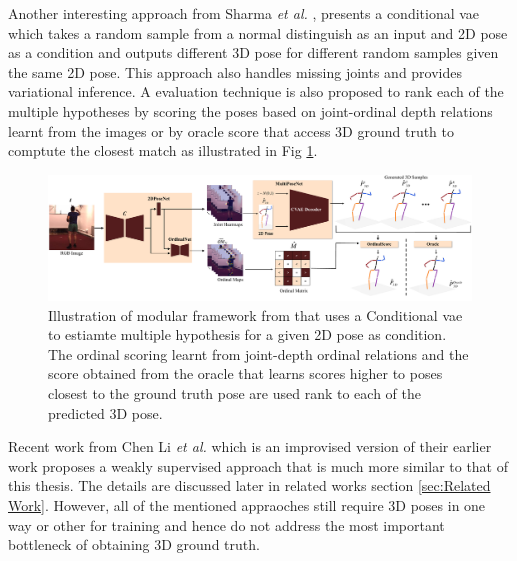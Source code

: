 Another interesting approach from Sharma \textit{et al.} \cite{ordinalranking}, presents a conditional \acl{vae} which takes a random sample from a normal distinguish as an input and 2D pose as a condition and outputs different 3D pose for different random samples given the same 2D pose. This approach also handles missing joints and provides variational inference. A evaluation technique is also proposed to rank each of the multiple hypotheses by scoring the poses based on joint-ordinal depth relations learnt from the images or by oracle score that access 3D ground truth to comptute the closest match as illustrated in Fig \ref{fig:ordinal_arch}.

\begin{figure}[h]
    \centering
    \includegraphics[width=\linewidth]{figures/background/ordinal_arch.pdf}
    \caption{Illustration of modular framework from \cite{ordinalranking} that uses a Conditional \ac{vae} to estiamte multiple hypothesis for a given 2D pose as condition. The ordinal scoring learnt from joint-depth ordinal relations and the score obtained from the oracle that learns scores higher to poses closest to the ground truth pose are used rank to each of the predicted 3D pose.}
    \label{fig:ordinal_arch}
\end{figure}

Recent work from Chen Li \textit{et al.} \cite{weaklymultiple} which is an improvised version of their earlier work \cite{multiplehypo} proposes a weakly supervised approach that is much more similar to that of this thesis. The details are discussed later in related works section \ref{sec:Related Work}. However, all of the mentioned appraoches still require 3D poses in one way or other for training and hence do not address the most important bottleneck of obtaining 3D ground truth. 

